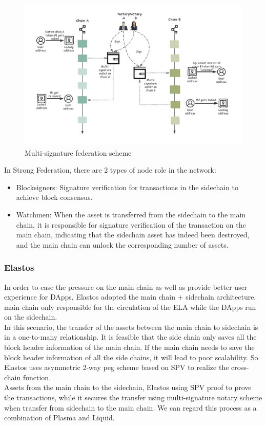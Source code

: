         \begin{figure}[H]
        \includegraphics[width=1\textwidth]{./figures/multi_sig.png}
        \centering
        \caption{Multi-signature federation scheme}%
        \centering
        \label{fig:multisig}
        \end{figure}
        
\noindent In Strong Federation, there are 2 types of node role in the network:
\begin{itemize}
    \item Blocksigners: Signature verification for transactions in the sidechain to achieve block consensus. 
    \item Watchmen: When the asset is transferred from the sidechain to the main chain, it is responsible for signature verification of the transaction on the main chain, indicating that the sidechain asset has indeed been destroyed, and the main chain can unlock the corresponding number of assets.
\end{itemize}

\subsubsection{Elastos}
\noindent In order to ease the pressure on the main chain as well as provide better user experience for DApps, Elastos\cite{Elastos} adopted the main chain + sidechain architecture,  main chain only responsible for the circulation of the ELA while the DApps run on the sidechain. \\
\noindent In this scenario, the transfer of the assets between the main chain to sidechain is in a one-to-many relationship. It is feasible that the side chain only saves all the block header information of the main chain. If the main chain needs to save the block header information of all the side chains, it will lead to poor scalability. So Elastos uses asymmetric 2-way peg scheme based on SPV to realize the cross-chain function.\\
\noindent Assets from the main chain to the sidechain, Elastos using SPV proof to prove the transactions, while it secures the transfer using multi-signature notary scheme when transfer from sidechain to the main chain. We can regard this process as a combination of Plasma and Liquid.

